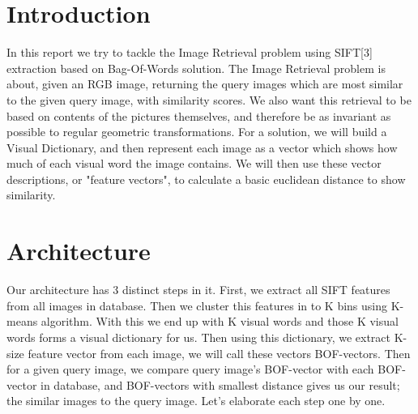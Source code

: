 \documentclass[conference,compsoc]{IEEEtran}
\begin{document}
\maketitle






%
\IEEEpeerreviewmaketitle



\section{Introduction}
In this report we try to tackle the Image Retrieval problem using SIFT[3] extraction based on Bag-Of-Words solution. The Image Retrieval problem is about, given an RGB image, returning the query images which are most similar to the given query image, with similarity scores. We also want this retrieval to be based on contents of the pictures themselves, and therefore be as invariant as possible to regular geometric transformations. For a solution, we will build a Visual Dictionary, and then represent each image as a vector which shows how much of each visual word the image contains. We will then use these vector descriptions, or "feature vectors", to calculate a basic euclidean distance to show similarity.


\section{Architecture}
Our architecture has 3 distinct steps in it. First, we extract all SIFT features from all images in database. Then we cluster this features in to K bins using K-means algorithm. With this we end up with K visual words and those K visual words forms a visual dictionary for us. Then using this dictionary, we extract K-size feature vector from each image, we will call these vectors BOF-vectors. Then for a given query image, we compare query image's BOF-vector with each BOF-vector in database, and BOF-vectors with smallest distance gives us our result; the similar images to the query image. Let's elaborate each step one by one.
\end{document}
